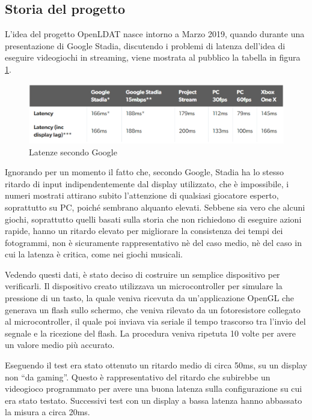 \subsection{Storia del progetto}
L'idea del progetto OpenLDAT nasce intorno a Marzo 2019, quando durante una presentazione di Google Stadia, discutendo i problemi di latenza dell'idea di eseguire videogiochi in streaming, viene mostrata al pubblico la tabella in figura \ref{fig:stadialies}.
\begin{figure}[h]
	\centering
	\includegraphics[width=\textwidth]{Introduzione_files/lies.png}
	\caption{Latenze secondo Google}
	\label{fig:stadialies}
\end{figure}

Ignorando per un momento il fatto che, secondo Google, Stadia ha lo stesso ritardo di input indipendentemente dal display utilizzato, che è impossibile, i numeri mostrati attirano subito l'attenzione di qualsiasi giocatore esperto, soprattutto su PC, poiché sembrano alquanto elevati. Sebbene sia vero che alcuni giochi, soprattutto quelli basati sulla storia che non richiedono di eseguire azioni rapide, hanno un ritardo elevato per migliorare la consistenza dei tempi dei fotogrammi, non è sicuramente rappresentativo nè del caso medio, nè del caso in cui la latenza è critica, come nei giochi musicali.

Vedendo questi dati, è stato deciso di costruire un semplice dispositivo per verificarli. Il dispositivo creato utilizzava un microcontroller per simulare la pressione di un tasto, la quale veniva ricevuta da un'applicazione OpenGL che generava un flash sullo schermo, che veniva rilevato da un fotoresistore collegato al microcontroller, il quale poi inviava via seriale il tempo trascorso tra l'invio del segnale e la ricezione del flash. La procedura veniva ripetuta 10 volte per avere un valore medio più accurato.

Eseguendo il test era stato ottenuto un ritardo medio di circa 50ms\cite{fdossena1}, su un display non ``da gaming''. Questo è rappresentativo del ritardo che subirebbe un videogioco programmato per avere una buona latenza sulla configurazione su cui era stato testato. Successivi test con un display a bassa latenza hanno abbassato la misura a circa 20ms.

